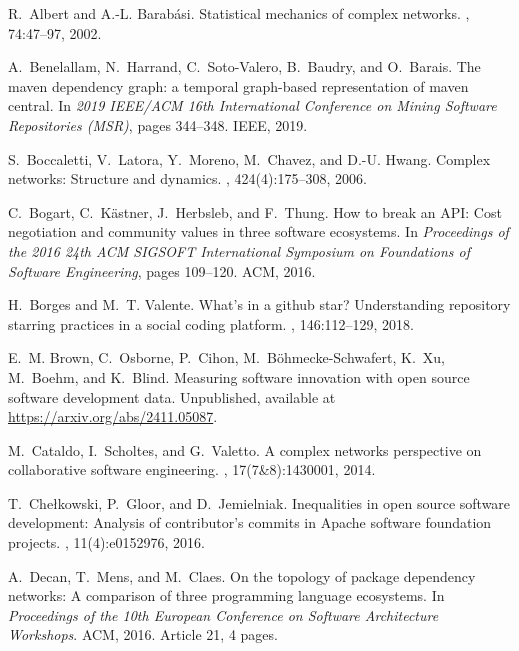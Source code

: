 \documentclass[10pt,conference]{IEEEtran}
\begin{document}
%
%
\begin{thebibliography}{10}

R.~Albert and A.-L. Barab\'asi.
\newblock Statistical mechanics of complex networks.
, 74:47--97, 2002.

A.~Benelallam, N.~Harrand, C.~Soto-Valero, B.~Baudry, and O.~Barais.
\newblock The maven dependency graph: a temporal graph-based representation of
  maven central.
\newblock In {\em 2019 IEEE/ACM 16th International Conference on Mining
  Software Repositories (MSR)}, pages 344--348. IEEE, 2019.

S.~Boccaletti, V.~Latora, Y.~Moreno, M.~Chavez, and D.-U. Hwang.
\newblock Complex networks: Structure and dynamics.
, 424(4):175--308, 2006.

C.~Bogart, C.~K{\"a}stner, J.~Herbsleb, and F.~Thung.
\newblock How to break an {API}: Cost negotiation and community values in three
  software ecosystems.
\newblock In {\em Proceedings of the 2016 24th ACM SIGSOFT International
  Symposium on Foundations of Software Engineering}, pages 109--120. ACM, 2016.

H.~Borges and M.~T. Valente.
\newblock What’s in a github star? {Understanding} repository starring
  practices in a social coding platform.
, 146:112--129, 2018.

E.~M. Brown, C.~Osborne, P.~Cihon, M.~B\"ohmecke-Schwafert, K.~Xu, M.~Boehm,
  and K.~Blind.
\newblock Measuring software innovation with open source software development
  data.
\newblock Unpublished, available at \url{https://arxiv.org/abs/2411.05087}.

M.~Cataldo, I.~Scholtes, and G.~Valetto.
\newblock A complex networks perspective on collaborative software engineering.
, 17(7\&8):1430001, 2014.

T.~Che{\l}kowski, P.~Gloor, and D.~Jemielniak.
\newblock Inequalities in open source software development: Analysis of
  contributor’s commits in {Apache} software foundation projects.
, 11(4):e0152976, 2016.

A.~Decan, T.~Mens, and M.~Claes.
\newblock On the topology of package dependency networks: A comparison of three
  programming language ecosystems.
\newblock In {\em Proceedings of the 10th European Conference on Software
  Architecture Workshops}. ACM, 2016.
\newblock Article 21, 4 pages.


\end{thebibliography}
\end{document}
